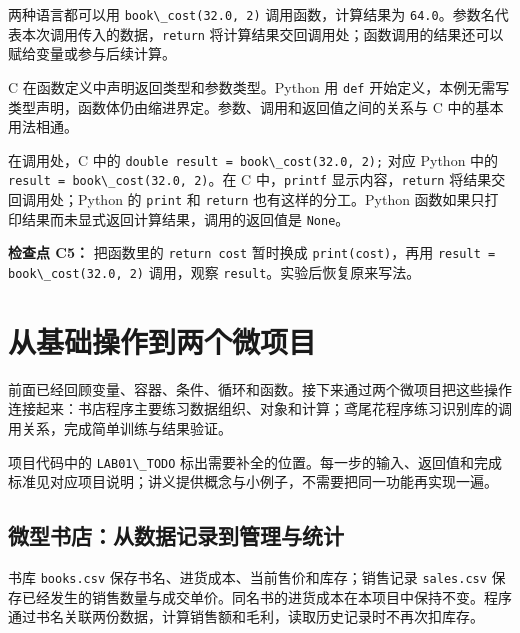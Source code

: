 \documentclass[UTF8,a4paper,11pt,fontset=fandol]{ctexart}
\providecommand{\passthrough}[1]{#1}
\begin{document}
两种语言都可以用 \passthrough{\lstinline!book\_cost(32.0, 2)!} 调用函数，计算结果为 \passthrough{\lstinline!64.0!}。参数名代表本次调用传入的数据，\passthrough{\lstinline!return!} 将计算结果交回调用处；函数调用的结果还可以赋给变量或参与后续计算。

C 在函数定义中声明返回类型和参数类型。Python 用 \passthrough{\lstinline!def!} 开始定义，本例无需写类型声明，函数体仍由缩进界定。参数、调用和返回值之间的关系与 C 中的基本用法相通。

在调用处，C 中的 \passthrough{\lstinline!double result = book\_cost(32.0, 2);!} 对应 Python 中的 \passthrough{\lstinline!result = book\_cost(32.0, 2)!}。在 C 中，\passthrough{\lstinline!printf!} 显示内容，\passthrough{\lstinline!return!} 将结果交回调用处；Python 的 \passthrough{\lstinline!print!} 和 \passthrough{\lstinline!return!} 也有这样的分工。Python 函数如果只打印结果而未显式返回计算结果，调用的返回值是 \passthrough{\lstinline!None!}。

\textbf{检查点 C5：} 把函数里的 \passthrough{\lstinline!return cost!} 暂时换成 \passthrough{\lstinline!print(cost)!}，再用 \passthrough{\lstinline!result = book\_cost(32.0, 2)!} 调用，观察 \passthrough{\lstinline!result!}。实验后恢复原来写法。

\clearpage

\section{从基础操作到两个微项目}\label{ux4eceux57faux7840ux64cdux4f5cux5230ux4e24ux4e2aux5faeux9879ux76ee}

前面已经回顾变量、容器、条件、循环和函数。接下来通过两个微项目把这些操作连接起来：书店程序主要练习数据组织、对象和计算；鸢尾花程序练习识别库的调用关系，完成简单训练与结果验证。

项目代码中的 \passthrough{\lstinline!LAB01\_TODO!} 标出需要补全的位置。每一步的输入、返回值和完成标准见对应项目说明；讲义提供概念与小例子，不需要把同一功能再实现一遍。

\subsection{微型书店：从数据记录到管理与统计}\label{ux5faeux578bux4e66ux5e97ux4eceux6570ux636eux8bb0ux5f55ux5230ux7ba1ux7406ux4e0eux7edfux8ba1}

书库 \passthrough{\lstinline!books.csv!} 保存书名、进货成本、当前售价和库存；销售记录 \passthrough{\lstinline!sales.csv!} 保存已经发生的销售数量与成交单价。同名书的进货成本在本项目中保持不变。程序通过书名关联两份数据，计算销售额和毛利，读取历史记录时不再次扣库存。
\end{document}
